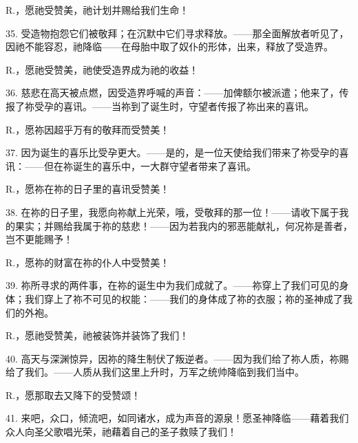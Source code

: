 R.，愿祂受赞美，祂计划并赐给我们生命！\par

35. 受造物抱怨它们被敬拜；在沉默中它们寻求释放。——那全面解放者听见了，因祂不能容忍，祂降临——在母胎中取了奴仆的形体，出来，释放了受造界。\par

R.，愿祂受赞美，祂使受造界成为祂的收益！\par

36. 慈悲在高天被点燃，因受造界呼喊的声音：——加俾额尔被派遣；他来了，传报了祢受孕的喜讯。——当祢到了诞生时，守望者传报了祢出来的喜讯。\par

R.，愿祢因超乎万有的敬拜而受赞美！\par

37. 因为诞生的喜乐比受孕更大。——是的，是一位天使给我们带来了祢受孕的喜讯：——但在祢诞生的喜乐中，一大群守望者带来了喜讯。\par

R.，愿祢在祢的日子里的喜讯受赞美！\par

38. 在祢的日子里，我愿向祢献上光荣，哦，受敬拜的那一位！——请收下属于我的果实；并赐给我属于祢的慈悲！——因为若我内的邪恶能献礼，何况祢是善者，岂不更能赐予！\par

R.，愿祢的财富在祢的仆人中受赞美！\par

39. 祢所寻求的两件事，在祢的诞生中为我们成就了。——祢穿上了我们可见的身体；我们穿上了祢不可见的权能：——我们的身体成了祢的衣服；祢的圣神成了我们的外袍。\par

R.，愿祂受赞美，祂被装饰并装饰了我们！\par

40. 高天与深渊惊异，因祢的降生制伏了叛逆者。——因为我们给了祢人质，祢赐给了我们。——人质从我们这里上升时，万军之统帅降临到我们当中。\par

R.，愿那取去又降下的受赞颂！\par

41. 来吧，众口，倾流吧，如同诸水，成为声音的源泉！愿圣神降临——藉着我们众人向圣父歌唱光荣，祂藉着自己的圣子救赎了我们！\par

\par



